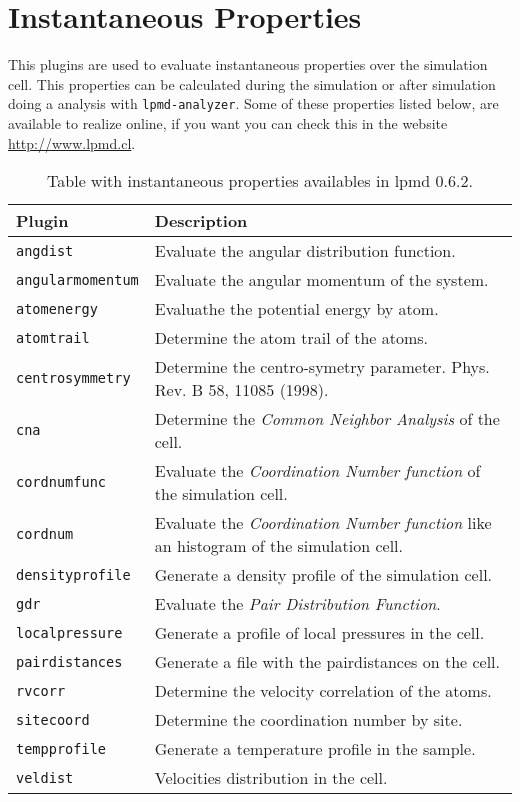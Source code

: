 \section{Instantaneous Properties}
This plugins are used to evaluate instantaneous properties over the simulation
cell. This properties can be calculated during the simulation or after
simulation doing a analysis with \texttt{lpmd-analyzer}. Some of these
properties listed below, are available to realize online, if you want you can
check this in the website \url{http://www.lpmd.cl}.

\begin{table}[h!]\centering
 \begin{tabular}{|l|p{13cm}|}\hline
 Plugin & Description \\
 \hline
 \texttt{angdist} & Evaluate the angular distribution function.\\
 \hline
 \texttt{angularmomentum} & Evaluate the angular momentum of the system.\\
 \hline
 \texttt{atomenergy} & Evaluathe the potential energy by atom.\\
 \hline
 \texttt{atomtrail} & Determine the atom trail of the atoms.\\
 \hline
 \texttt{centrosymmetry} & Determine the centro-symetry parameter. Phys. Rev. B
 58, 11085 (1998).\\
 \texttt{cna} & Determine the \textit{Common Neighbor Analysis} of the cell.\\
 \hline
 \texttt{cordnumfunc} & Evaluate the \textit{Coordination Number function} of
 the simulation cell.\\
 \hline
 \texttt{cordnum} & Evaluate the \textit{Coordination Number function} like an
 histogram of the simulation cell.\\
 \hline
 \texttt{densityprofile} & Generate a density profile of the simulation cell.\\
 \hline
 \texttt{gdr} & Evaluate the \textit{Pair Distribution Function}.\\
 \hline
 \texttt{localpressure} & Generate a profile of local pressures in the cell.\\
 \hline
 \texttt{pairdistances} & Generate a file with the pairdistances on the cell.\\
 \hline
 \texttt{rvcorr} & Determine the velocity correlation of the atoms.\\
 \hline
 \texttt{sitecoord} & Determine the coordination number by site.\\
 \hline
 \texttt{tempprofile} & Generate a temperature profile in the sample.\\
 \hline
 \texttt{veldist} & Velocities distribution in the cell.\\
 \hline
 \end{tabular}
\label{tab:modproper}
\caption{Table with instantaneous properties availables in lpmd 0.6.2.}
\end{table}

